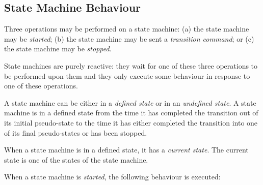 \documentclass[definition]{../fwprofile}
\begin{document}
\subsection{State Machine Behaviour}\label{sec:smBehaviour}
Three operations may be performed on a state machine: (a) the state machine may be \emph{started};
(b) the state machine may be sent a \emph{transition command}; or (c) the state machine may be
\emph{stopped}.

State machines are purely reactive: they wait for one of these three operations to be performed
upon them and they only execute some behaviour in response to one of these operations.

A state machine can be either in a \emph{defined state} or in an \emph{undefined state}. A state machine is in a
defined state from the time it has completed the transition out of its initial pseudo-state to the
time it has either completed the transition into one of its final pseudo-states or has been
stopped.

When a state machine is in a defined state, it has a \emph{current state}. The current state is one of the
states of the state machine.

When a state machine is \emph{started}, the following behaviour is executed:
\end{document}
